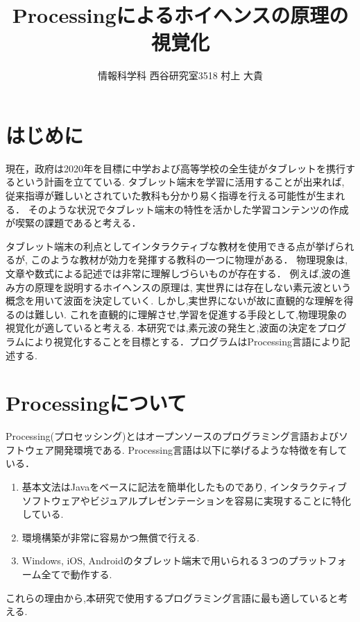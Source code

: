 \documentclass[a4j,twocolumn,uplatex]{jarticle}
\begin{document}
\title{Processingによるホイヘンスの原理の視覚化}
\author{情報科学科 西谷研究室3518 村上 大貴}
\date{}
\maketitle
\section{はじめに}
現在，政府は2020年を目標に中学および高等学校の全生徒がタブレットを携行するという計画を立てている\cite{tablet}.
タブレット端末を学習に活用することが出来れば,
従来指導が難しいとされていた教科も分かり易く指導を行える可能性が生まれる．
そのような状況でタブレット端末の特性を活かした学習コンテンツの作成が喫緊の課題であると考える．

タブレット端末の利点としてインタラクティブな教材を使用できる点が挙げられるが,
このような教材が効力を発揮する教科の一つに物理がある．
物理現象は,文章や数式による記述では非常に理解しづらいものが存在する．
例えば,波の進み方の原理を説明するホイヘンスの原理は,
実世界には存在しない素元波という概念を用いて波面を決定していく.
しかし,実世界にないが故に直観的な理解を得るのは難しい.
これを直観的に理解させ,学習を促進する手段として,物理現象の視覚化が適していると考える.
本研究では,素元波の発生と,波面の決定をプログラムにより視覚化することを目標とする．プログラムはProcessing言語により記述する.
\vspace{-4mm}

\section{Processingについて}
Processing(プロセッシング)とはオープンソースのプログラミング言語およびソフトウェア開発環境である.
Processing言語は以下に挙げるような特徴を有している\cite{ishikawa}．
\begin{enumerate}
\item 基本文法はJavaをベースに記法を簡単化したものであり,
インタラクティブソフトウェアやビジュアルプレゼンテーションを容易に実現することに特化している.
\item 環境構築が非常に容易かつ無償で行える.
\item Windows, iOS, Androidのタブレット端末で用いられる３つのプラットフォーム全てで動作する. %
\end{enumerate}
これらの理由から,本研究で使用するプログラミング言語に最も適していると考える.
\vspace{-4mm}
\end{document}

